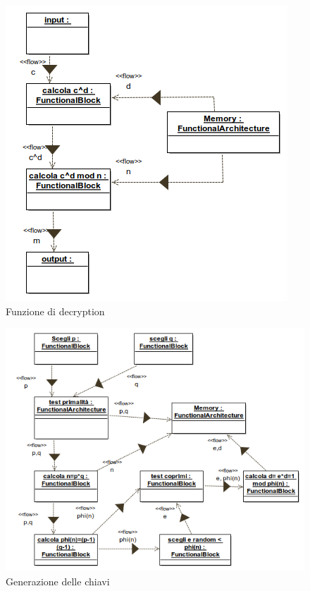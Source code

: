 \begin{figure}[h!] 
    \centering 
    \includegraphics[scale=0.5]{../img/RSA/Decryption_Object_diagram.png} 
    \caption{Funzione di decryption} 
\end{figure}
\begin{figure}[h!] 
    \centering 
    \includegraphics[scale=0.5]{../img/RSA/Key_Generation_Object_diagram.png} 
    \caption{Generazione delle chiavi} 
\end{figure}

\clearpage

